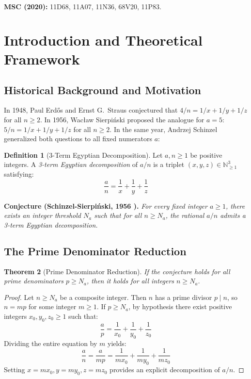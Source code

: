 \documentclass[11pt,a4paper]{article}
\newtheorem{theorem}{Theorem}[section]
\theoremstyle{definition}
\newtheorem{definition}[theorem]{Definition}
\begin{document}
\noindent\textbf{MSC (2020):} 11D68, 11A07, 11N36, 68V20, 11P83.

\tableofcontents
\newpage

\section{Introduction and Theoretical Framework}

\subsection{Historical Background and Motivation}
In 1948, Paul Erd\H{o}s and Ernst G.~Straus \cite{erdos1948straus} conjectured that $4/n = 1/x + 1/y + 1/z$ for all $n \ge 2$.
In 1956, Wac{\l}aw Sierpi\'nski \cite{sierpinski1956} proposed the analogue for $a = 5$: $5/n = 1/x + 1/y + 1/z$ for all $n \ge 2$.
In the same year, Andrzej Schinzel \cite{schinzel1956} generalized both questions to all fixed numerators $a$:

\begin{definition}[3-Term Egyptian Decomposition]\label{def:egyptian_three}
Let $a, n \ge 1$ be positive integers.
A \emph{3-term Egyptian decomposition} of $a / n$ is a triplet $(x, y, z) \in \mathbb{N}_{\ge 1}^3$ satisfying:
\begin{equation}\label{eq:egyptian_def}
\frac{a}{n} = \frac{1}{x} + \frac{1}{y} + \frac{1}{z}
\end{equation}
\end{definition}

\noindent\textbf{Conjecture (Schinzel-Sierpi\'nski, 1956 \cite{schinzel1956}).} \textit{For every fixed integer $a \ge 1$, there exists an integer threshold $N_a$ such that for all $n \ge N_a$, the rational $a / n$ admits a 3-term Egyptian decomposition.}

\subsection{The Prime Denominator Reduction}

\begin{theorem}[Prime Denominator Reduction]\label{thm:prime_red}
If the conjecture holds for all prime denominators $p \ge N_a$, then it holds for all integers $n \ge N_a$.
\end{theorem}

\begin{proof}
Let $n \ge N_a$ be a composite integer.
Then $n$ has a prime divisor $p \mid n$, so $n = m p$ for some integer $m \ge 1$.
If $p \ge N_a$, by hypothesis there exist positive integers $x_0, y_0, z_0 \ge 1$ such that:
\[ \frac{a}{p} = \frac{1}{x_0} + \frac{1}{y_0} + \frac{1}{z_0} \]
Dividing the entire equation by $m$ yields:
\[ \frac{a}{n} = \frac{a}{m p} = \frac{1}{m x_0} + \frac{1}{m y_0} + \frac{1}{m z_0} \]
Setting $x = m x_0, y = m y_0, z = m z_0$ provides an explicit decomposition of $a / n$.
\end{proof}
\end{document}
